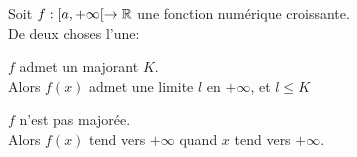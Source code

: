 \documentclass[12pt,twoside,a4paper]{article}
\begin{document}
		\begin{prop}
			Soit $f:[a,+\infty[\rightarrow \mathbb{R}$ une fonction num\'erique croissante.\\
			De deux choses l'une:
			\begin{liste}
				\item $f$ admet un majorant $K$.\\
					Alors $f(x)$ admet une limite $l$ en $+\infty$, et $l\leqslant K$
				\item $f$ n'est pas major\'ee.\\
					Alors $f(x)$ tend vers $+\infty$ quand $x$ tend vers $+\infty$.
			\end{liste}
		\end{prop}
\end{document}
